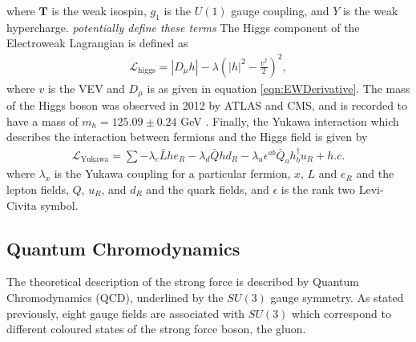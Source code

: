 where $\textbf{T}$ is the weak isospin, $g_{1}$ is the $U(1)$ gauge coupling, and $Y$ is the weak hypercharge. \textit{potentially define these terms}
The Higgs component of the Electroweak Lagrangian is defined as 
\begin{align}
\mathcal{L}_{\textrm{higgs}} = \left| D_{\mu} h \right| -\lambda \left( \left| h \right|^{2} - \frac{v^{2}}{2} \right)^{2},
\end{align}
where $v$ is the VEV and $D_{\mu}$ is as given in equation \ref{eqn:EWDerivative}. 
The mass of the Higgs boson was observed in 2012 by ATLAS and CMS, and is recorded to have a mass of $m_{h} = 125.09 \pm 0.24$ GeV \cite{aad2012observation, chatrchyan2012observation}.
Finally, the Yukawa interaction which describes the interaction between fermions and the Higgs field is given by
\begin{align}
\mathcal{L}_{\textrm{Yukawa}} = \sum -\lambda_{e} \bar{L} h e_{R} - \lambda_{d} \bar{Q} h d_{R} - \lambda_{u} \epsilon^{ab}\bar{Q}_{a} h^{\dagger}_{b} u_{R} + h.c.
\end{align}
where $\lambda_{x}$ is the Yukawa coupling for a particular fermion, $x$, $L$ and $e_{R}$ and the lepton fields, $Q$, $u_{R}$, and $d_{R}$ and the quark fields, and $\epsilon$ is the rank two Levi-Civita symbol.

\subsection{Quantum Chromodynamics}
The theoretical description of the strong force is described by Quantum Chromodynamics (QCD), underlined by the $SU(3)$ gauge symmetry. 
As stated previously, eight gauge fields are associated with $SU(3)$ which correspond to different coloured states of the strong force boson, the gluon.

